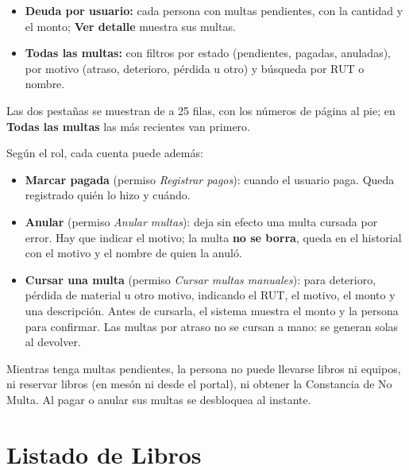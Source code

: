 \documentclass[11pt,a4paper]{report}
\begin{document}
\begin{itemize}
  \item \textbf{Deuda por usuario:} cada persona con multas pendientes,
  con la cantidad y el monto; \textbf{Ver detalle} muestra sus multas.
  \item \textbf{Todas las multas:} con filtros por estado (pendientes,
  pagadas, anuladas), por motivo (atraso, deterioro, pérdida u otro) y
  búsqueda por RUT o nombre.
\end{itemize}

Las dos pestañas se muestran de a 25 filas, con los números de página al
pie; en \textbf{Todas las multas} las más recientes van primero.


Según el rol, cada cuenta puede además:

\begin{itemize}
  \item \textbf{Marcar pagada} (permiso \textit{Registrar pagos}): cuando
  el usuario paga. Queda registrado quién lo hizo y cuándo.
  \item \textbf{Anular} (permiso \textit{Anular multas}): deja sin efecto
  una multa cursada por error. Hay que indicar el motivo; la multa
  \textbf{no se borra}, queda en el historial con el motivo y el nombre de
  quien la anuló.
  \item \textbf{Cursar una multa} (permiso \textit{Cursar multas
  manuales}): para deterioro, pérdida de material u otro motivo, indicando
  el RUT, el motivo, el monto y una descripción. Antes de cursarla, el
  sistema muestra el monto y la persona para confirmar. Las multas por
  atraso no se cursan a mano: se generan solas al devolver.
\end{itemize}

\begin{nota}
Mientras tenga multas pendientes, la persona no puede llevarse libros ni
equipos, ni reservar libros (en mesón ni desde el portal), ni obtener la
Constancia de No Multa. Al pagar o anular sus multas se desbloquea al
instante.
\end{nota}

\section{Listado de Libros}

\end{document}

